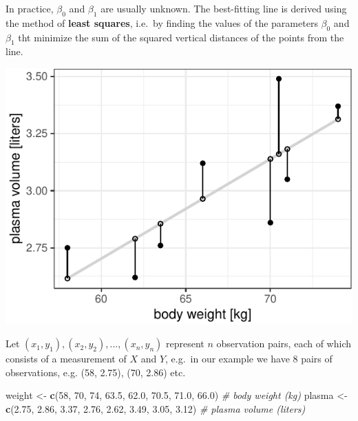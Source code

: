 \documentclass[]{article}
\newenvironment{Shaded}{\begin{snugshade}}{\end{snugshade}}
\newcommand{\CommentTok}[1]{\textcolor[rgb]{0.56,0.35,0.01}{\textit{#1}}}
\newcommand{\DecValTok}[1]{\textcolor[rgb]{0.00,0.00,0.81}{#1}}
\newcommand{\FloatTok}[1]{\textcolor[rgb]{0.00,0.00,0.81}{#1}}
\newcommand{\KeywordTok}[1]{\textcolor[rgb]{0.13,0.29,0.53}{\textbf{#1}}}
\newcommand{\NormalTok}[1]{#1}
\newcommand{\StringTok}[1]{\textcolor[rgb]{0.31,0.60,0.02}{#1}}
\begin{document}
In practice, \(\beta_0\) and \(\beta_1\) are usually unknown. The
best-fitting line is derived using the method of \textbf{least squares},
i.e.~by finding the values of the parameters \(\beta_0\) and \(\beta_1\)
tht minimize the sum of the squared vertical distances of the points
from the line.

\begin{center}\includegraphics{session-regression-I-files/figures/coeff-residuals-1} \end{center}

Let \((x_1, y_1), (x_2, y_2), ..., (x_n, y_n)\) represent \(n\)
observation pairs, each of which consists of a measurement of \(X\) and
\(Y\), e.g.~in our example we have 8 pairs of observations, e.g. (58,
2.75), (70, 2.86) etc.

\begin{Shaded}
\begin{Highlighting}[]
\NormalTok{weight <-}\StringTok{ }\KeywordTok{c}\NormalTok{(}\DecValTok{58}\NormalTok{, }\DecValTok{70}\NormalTok{, }\DecValTok{74}\NormalTok{, }\FloatTok{63.5}\NormalTok{, }\FloatTok{62.0}\NormalTok{, }\FloatTok{70.5}\NormalTok{, }\FloatTok{71.0}\NormalTok{, }\FloatTok{66.0}\NormalTok{) }\CommentTok{# body weight (kg)}
\NormalTok{plasma <-}\StringTok{ }\KeywordTok{c}\NormalTok{(}\FloatTok{2.75}\NormalTok{, }\FloatTok{2.86}\NormalTok{, }\FloatTok{3.37}\NormalTok{, }\FloatTok{2.76}\NormalTok{, }\FloatTok{2.62}\NormalTok{, }\FloatTok{3.49}\NormalTok{, }\FloatTok{3.05}\NormalTok{, }\FloatTok{3.12}\NormalTok{) }\CommentTok{# plasma volume (liters)}
\end{Highlighting}
\end{Shaded}
\end{document}
